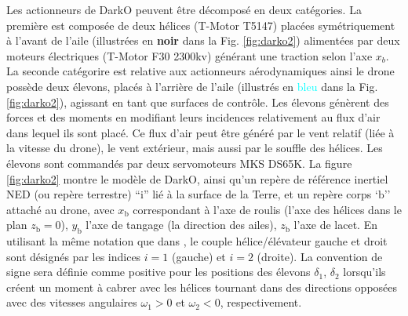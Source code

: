 Les actionneurs de DarkO peuvent être décomposé en deux catégories. La première est composée de deux hélices (T-Motor T5147) placées symétriquement à l'avant de l'aile (illustrées en \textbf{noir} dans la Fig. \ref{fig:darko2}) alimentées par deux moteurs électriques (T-Motor F30 2300kv) générant une traction selon l'axe $x_{b}$. La seconde catégorire est relative aux actionneurs aérodynamiques ainsi le drone possède deux élevons, placés à l'arrière de l'aile (illustrés en \textcolor{cyan}{bleu} dans la Fig. \ref{fig:darko2}), agissant en tant que surfaces de contrôle. Les élevons génèrent des forces et des moments en modifiant leurs incidences relativement au flux d'air dans lequel ils sont placé. Ce flux d'air peut être généré par le vent relatif (liée à la vitesse du drone), le vent extérieur, mais aussi par le souffle des hélices. Les élevons sont commandés par deux servomoteurs MKS DS65K. La figure \ref{fig:darko2} montre le modèle de DarkO, ainsi qu'un repère de référence inertiel NED (ou repère terrestre) ``$\text{i}$'' lié à la surface de la Terre, et un repère corps `$\text{b}$'' attaché au drone, avec $x_{\text{b}}$ correspondant à l'axe de roulis (l'axe des hélices dans le plan $z_{\text{b}} =0$), $y_{\text{b}}$ l'axe de tangage (la direction des ailes), $z_{\text{b}}$ l'axe de lacet. En utilisant la même notation que dans \cite{lustosa:hal-03035938}, le couple hélice/élévateur gauche et droit sont désignés par les indices $i=1$ (gauche) et $i=2$ (droite). La convention de signe sera définie comme positive pour les positions des élevons $\delta_{1}$, $\delta_{2}$ lorsqu'ils créent un moment à cabrer avec les hélices tournant dans des directions opposées avec des vitesses angulaires $\omega_{1} > 0$ et $\omega_{2} < 0$, respectivement.

